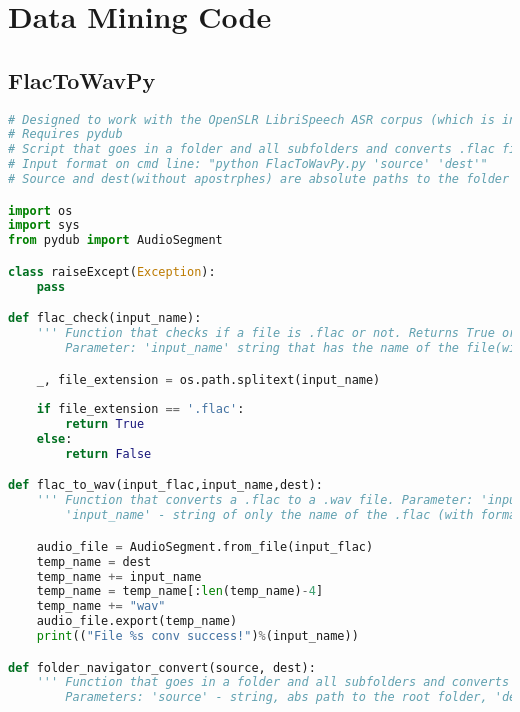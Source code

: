 \chapter{Data Mining Code}\label{ch:appDlabel}

\section{FlacToWavPy}
\begin{lstlisting}[language=Python, caption=FlacToWavPy code.]
# Designed to work with the OpenSLR LibriSpeech ASR corpus (which is in .flac)
# Requires pydub
# Script that goes in a folder and all subfolders and converts .flac files into .wav files. Can be imported as module or run directly from command line.
# Input format on cmd line: "python FlacToWavPy.py 'source' 'dest'"         
# Source and dest(without apostrphes) are absolute paths to the folder containing the .flac files and the folder to put the converted .wav files respecively 

import os
import sys
from pydub import AudioSegment

class raiseExcept(Exception):
    pass

def flac_check(input_name):
    ''' Function that checks if a file is .flac or not. Returns True or False (bool)
        Parameter: 'input_name' string that has the name of the file(with format). It may work with absolute path and name (maybe) '''    

    _, file_extension = os.path.splitext(input_name)
        
    if file_extension == '.flac':   
        return True
    else:
        return False

def flac_to_wav(input_flac,input_name,dest):
    ''' Function that converts a .flac to a .wav file. Parameter: 'input_flac' - string abs path to a .flac, 
        'input_name' - string of only the name of the .flac (with format), 'dest' string abs path to destination folder (with a '/' in the end!) '''

    audio_file = AudioSegment.from_file(input_flac)
    temp_name = dest
    temp_name += input_name
    temp_name = temp_name[:len(temp_name)-4]
    temp_name += "wav"
    audio_file.export(temp_name)
    print(("File %s conv success!")%(input_name))

def folder_navigator_convert(source, dest):
    ''' Function that goes in a folder and all subfolders and converts .flac files into .wav files.
        Parameters: 'source' - string, abs path to the root folder, 'dest' - string, abs path to dest folder (both must be with a '/' at the end!) '''


\end{lstlisting}
